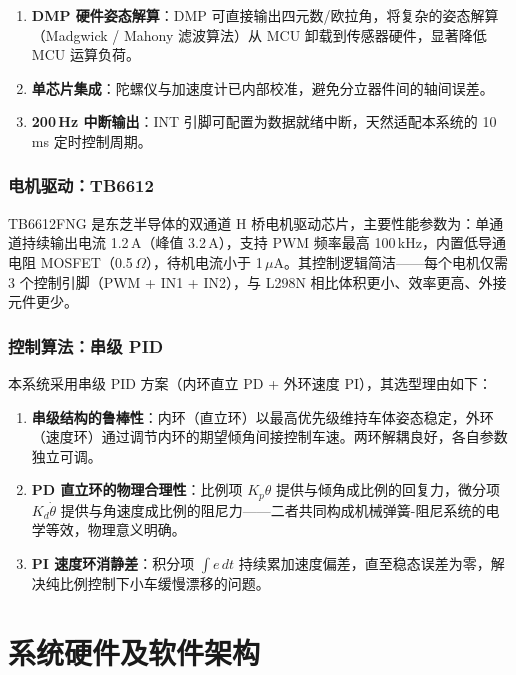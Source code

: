 \documentclass[12pt,a4paper,UTF8]{ctexrep}
\begin{document}
\begin{enumerate}
  \item \textbf{DMP 硬件姿态解算}：DMP 可直接输出四元数/欧拉角，将复杂的姿态解算（Madg\-wick / Mahony 滤波算法）从 MCU 卸载到传感器硬件，显著降低 MCU 运算负荷。
  \item \textbf{单芯片集成}：陀螺仪与加速度计已内部校准，避免分立器件间的轴间误差。
  \item \textbf{200\,Hz 中断输出}：INT 引脚可配置为数据就绪中断，天然适配本系统的 10\,ms 定时控制周期。
\end{enumerate}

\subsection{电机驱动：TB6612}

TB6612FNG 是东芝半导体的双通道 H 桥电机驱动芯片，主要性能参数为：单通道持续输出电流 1.2\,A（峰值 3.2\,A），支持 PWM 频率最高 100\,kHz，内置低导通电阻 MOSFET（0.5\,$\Omega$），待机电流小于 1\,$\mu$A。其控制逻辑简洁——每个电机仅需 3 个控制引脚（PWM + IN1 + IN2），与 L298N 相比体积更小、效率更高、外接元件更少。

\subsection{控制算法：串级 PID}

本系统采用串级 PID 方案（内环直立 PD + 外环速度 PI），其选型理由如下：

\begin{enumerate}
  \item \textbf{串级结构的鲁棒性}：内环（直立环）以最高优先级维持车体姿态稳定，外环（速度环）通过调节内环的期望倾角间接控制车速。两环解耦良好，各自参数独立可调。
  \item \textbf{PD 直立环的物理合理性}：比例项 $K_p\theta$ 提供与倾角成比例的回复力，微分项 $K_d\dot{\theta}$ 提供与角速度成比例的阻尼力——二者共同构成机械弹簧-阻尼系统的电学等效，物理意义明确。
  \item \textbf{PI 速度环消静差}：积分项 $\int e\,dt$ 持续累加速度偏差，直至稳态误差为零，解决纯比例控制下小车缓慢漂移的问题。
\end{enumerate}

\chapter{系统硬件及软件架构}
\end{document}
